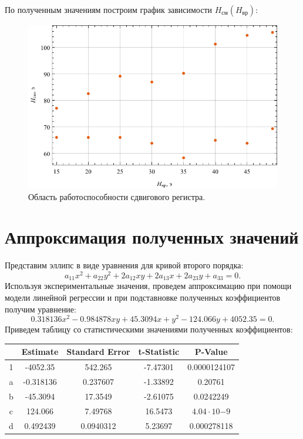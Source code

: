 \documentclass[a4paper, 12pt]{article}
\begin{document}
	По полученным значениям построим график зависимости $H_{\text{см}}(H_{\text{вр}})$:
	\begin{figure}[!htb]
		\centering
		\includegraphics[scale=1]{plot.pdf}
		\caption{Область работоспособности сдвигового регистра.}
		\label{fig1}
	\end{figure}
	\section{Аппроксимация полученных значений}
	Представим эллипс в виде уравнения для кривой второго порядка:
	\begin{equation*}
		a_{11}x^2+a_{22}y^2+2a_{12}xy+2a_{13}x+2a_{23}y+a_{33}=0.
	\end{equation*}
	Используя экспериментальные значения, проведем аппроксимацию при помощи модели линейной регрессии и при подставновке полученных коэффициентов получим уравнение:
	\begin{equation*}
		0.318136 x^2-0.984878 x y+45.3094 x+y^2-124.066 y+4052.35=0.
	\end{equation*}
	Приведем таблицу со статистическими значениями полученных коэффициентов:
	\newpage
	\begin{table}[!htb]
		\centering
		\begin{tabular}{|c||c|c|c|c|}
			\hline
			 & Estimate & Standard Error & t-Statistic & P-Value\\
			\hline
			1 & -4052.35 & 542.265 & -7.47301 & 0.0000124107 \\
 			a & -0.318136 & 0.237607 & -1.33892 & 0.20761 \\
			b & -45.3094 & 17.3549 & -2.61075 & 0.0242249 \\
			c & 124.066 & 7.49768 & 16.5473 & $4.04\cdot 10{-9}$ \\
			d & 0.492439 & 0.0940312 & 5.23697 & 0.000278118 \\
			\hline
		\end{tabular}
	\end{table}
\end{document}
